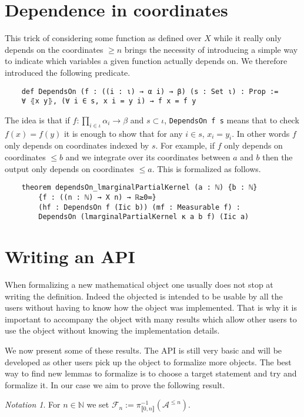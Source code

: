 \documentclass{article}
\newcommand{\lean}[1]{\lstinline[language=lean]{#1}}
\newcommand{\F}{\mathcal{F}}
\newcommand{\N}{\mathbb{N}}
\newcommand{\inv}{^{-1}}
\newcommand{\Alen}{\mathcal{A}^{\le n}}
\newcommand{\prth}[1]{\left(#1\right)}
\newcommand{\dbrack}[1]{\llbracket #1 \rrbracket}
\theoremstyle{definition}
\theoremstyle{remark}
\newtheorem*{nota}{Notation}
\begin{document}
	\section{Dependence in coordinates}

	This trick of considering some function as defined over $X$ while it really only depends on the coordinates $\ge n$ brings the necessity of introducing a simple way to indicate which variables a given function actually depends on. We therefore introduced the following predicate.
	\begin{lstlisting}
	def DependsOn (f : ((i : ι) → α i) → β) (s : Set ι) : Prop :=
	∀ ⦃x y⦄, (∀ i ∈ s, x i = y i) → f x = f y
	\end{lstlisting}
	The idea is that if $f : \prod_{i\in\iota} \alpha_i \to \beta$ and $s \subset \iota$, \lean{DependsOn f s} means that to check $f(x) = f(y)$ it is enough to show that for any $i \in s$, $x_i = y_i$. In other words $f$ only depends on coordinates indexed by $s$. For example, if $f$ only depends on coordinates $\le b$ and we integrate over its coordinates between $a$ and $b$ then the output only depends on coordinates $\le a$. This is formalized as follows.
	\begin{lstlisting}
	theorem dependsOn_lmarginalPartialKernel (a : ℕ) {b : ℕ}
		{f : ((n : ℕ) → X n) → ℝ≥0∞}
		(hf : DependsOn f (Iic b)) (mf : Measurable f) :
		DependsOn (lmarginalPartialKernel κ a b f) (Iic a)
	\end{lstlisting}

	\section{Writing an API}

	When formalizing a new mathematical object one usually does not stop at writing the definition. Indeed the objected is intended to be usable by all the users without having to know how the object was implemented. That is why it is important to accompany the object with many results which allow other users to use the object without knowing the implementation details.

	We now present some of these results. The API is still very basic and will be developed as other users pick up the object to formalize more objects. The best way to find new lemmas to formalize is to choose a target statement and try and formalize it. In our case we aim to prove the following result.

	\begin{nota}
		For $n \in \N$ we set $\F_n := \pi_{\dbrack{0,n}}\inv\prth{\Alen}$.
	\end{nota}
\end{document}
